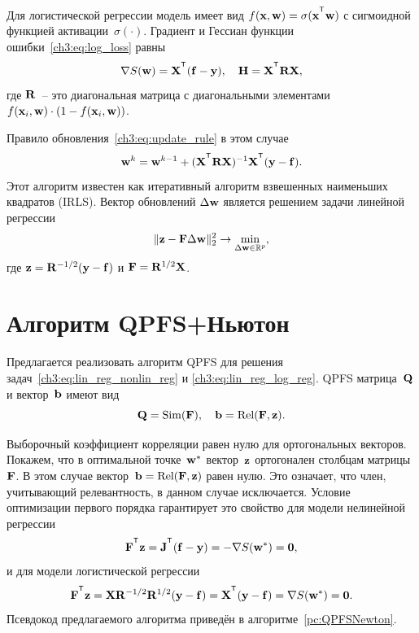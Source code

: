 Для логистической регрессии модель имеет вид $f(\bx , \bw) = \sigma(\bx^{\T} \bw)$ с сигмоидной функцией активации~$\sigma(\cdot)$.
Градиент и Гессиан функции ошибки~\eqref{ch3:eq:log_loss} равны
\begin{equation}
\nabla S(\bw) = \bX^{\T} (\mathbf{f} - \by), \quad \bH = \bX^{\T} \bR \bX,
\label{ch3:eq:log_reg_deriv}
\end{equation}
где $\mathbf{R}$~-- это диагональная матрица с диагональными элементами $f(\mathbf{x}_i , \mathbf{w}) \cdot (1 - f(\mathbf{x}_i , \mathbf{w}))$.

Правило обновления~\eqref{ch3:eq:update_rule} в этом случае
\[
\bw^k = \bw^{k - 1} + (\bX^{\T} \bR \bX)^{-1} \bX^{\T} (\by - \mathbf{f}).
\]
Этот алгоритм известен как итеративный алгоритм взвешенных наименьших квадратов (IRLS). Вектор обновлений $\Delta \mathbf{w}$ является решением задачи линейной регрессии
\begin{equation}
\| \mathbf{z} - \mathbf{F} \Delta \mathbf{w} \|_2^2 \rightarrow \min_{\Delta \mathbf{w} \in \mathbb{R}^{p}},
\label{ch3:eq:lin_reg_log_reg}
\end{equation}
где $\mathbf{z} = \mathbf{R}^{-1/2} (\mathbf{y} - \mathbf{f})$ и $\mathbf{F} = \mathbf{R}^{1/2}\mathbf{X}$.

\section{Алгоритм QPFS+Ньютон}

Предлагается реализовать алгоритм QPFS для решения задач~\eqref{ch3:eq:lin_reg_nonlin_reg} и \eqref{ch3:eq:lin_reg_log_reg}. 
QPFS матрица~$\mathbf{Q}$ и вектор~$\mathbf{b}$ имеют вид
\[
\mathbf{Q} = \text{Sim} (\mathbf{F}), \quad \mathbf{b} = \text{Rel} (\mathbf{F}, \mathbf{z}).
\]

Выборочный коэффициент корреляции равен нулю для ортогональных векторов.
Покажем, что в оптимальной точке~$\mathbf{w}^*$ вектор~$\mathbf{z}$ ортогонален столбцам матрицы~$\mathbf{F}$. 
В этом случае вектор~$\mathbf{b} = \text{Rel} (\mathbf{F}, \mathbf{z})$ равен нулю. Это означает, что член, учитывающий релевантность, в данном случае исключается.
Условие оптимизации первого порядка гарантирует это свойство для модели нелинейной регрессии
\[
\bF^{\T} \bz = \bJ^{\T} (\mathbf{f} - \by) = - \nabla S(\bw^*) = \boldsymbol{0},
\]
и для модели логистической регрессии
\[
\bF^{\T} \bz = \bX \bR^{-1/2} \bR^{1/2} (\by - \mathbf{f}) = \bX^{\T} (\by - \mathbf{f}) = \nabla S(\bw^*) = \boldsymbol{0}.
\]
Псевдокод предлагаемого алгоритма приведён в алгоритме~\ref{pc:QPFSNewton}.

